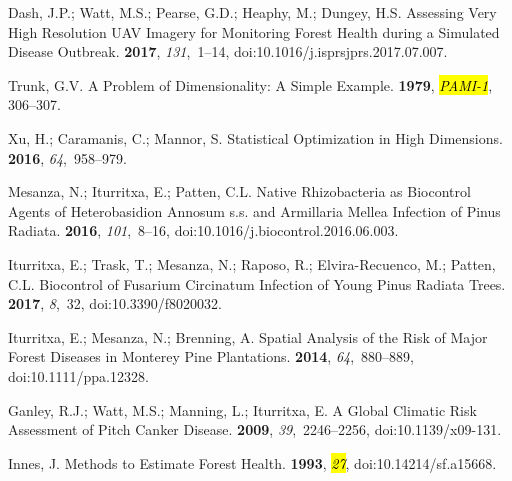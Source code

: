 \documentclass[remotesensing,article,accept,moreauthors,pdftex]{Definitions/mdpi}
\begin{document}
\begin{thebibliography}{999}
Dash, J.P.; Watt, M.S.; Pearse, G.D.; Heaphy, M.; Dungey, H.S.
\newblock Assessing Very High Resolution {{UAV}} Imagery for Monitoring Forest
  Health during a Simulated Disease Outbreak.
 {\bf 2017},
  {\em 131},~1--14, doi:10.1016/j.isprsjprs.2017.07.007.

Trunk, G.V.
\newblock A {{Problem}} of {{Dimensionality}}: A {{Simple Example}}.
  {\bf 1979}, {\em \hl{PAMI-1}}, %
 306--307.

Xu, H.; Caramanis, C.; Mannor, S.
\newblock Statistical {{Optimization}} in {{High Dimensions}}.
 {\bf 2016}, {\em 64},~958--979.

Mesanza, N.; Iturritxa, E.; Patten, C.L.
\newblock Native Rhizobacteria as Biocontrol Agents of {{Heterobasidion}}
  Annosum s.s. and {{Armillaria}} Mellea Infection of {{Pinus}} Radiata.
 {\bf 2016}, {\em 101},~8--16, doi:10.1016/j.biocontrol.2016.06.003.

Iturritxa, E.; Trask, T.; Mesanza, N.; Raposo, R.; {Elvira-Recuenco}, M.;
  Patten, C.L.
\newblock Biocontrol of {{Fusarium}} Circinatum Infection of Young {{Pinus}}
  Radiata Trees.
 {\bf 2017}, {\em 8},~32, doi:10.3390/f8020032.

Iturritxa, E.; Mesanza, N.; Brenning, A.
\newblock Spatial Analysis of the Risk of Major Forest Diseases in {{Monterey}}
  Pine Plantations.
 {\bf 2014}, {\em 64},~880--889, doi:10.1111/ppa.12328.

Ganley, R.J.; Watt, M.S.; Manning, L.; Iturritxa, E.
\newblock A Global Climatic Risk Assessment of Pitch Canker Disease.
 {\bf 2009}, {\em
  39},~2246--2256, doi:10.1139/x09-131.

Innes, J.
\newblock Methods to Estimate Forest Health.
 {\bf 1993}, {\em \hl{27}}, %
 doi:10.14214/sf.a15668.


\end{thebibliography}
\end{document}
